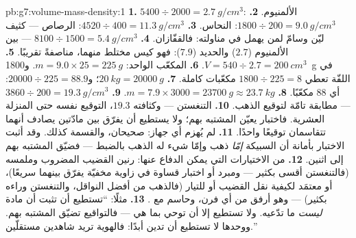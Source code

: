 \begin{solution}{pb:g7:volume-mass-density:1}
\textbf{1.} $5400 \div 2000 = \qty{2.7}{g/cm^3}$: الألمنيوم.
\textbf{2.} $1800 \div 200 = \qty{9.0}{g/cm^3}$: النحاس.
\textbf{3.} $4520 \div 400 = \qty{11.3}{g/cm^3}$: الرصاص ---
كثيف ليّن وسامّ لمن يهمل في مناولته: فالقفّازان.
\textbf{4.} $8100 \div 1500 = \qty{5.4}{g/cm^3}$ --- بين
الألمنيوم ($2.7$) والحديد ($7.9$): فهو كيس مختلط منهما،
مناصفةً  تقريبًا.
\textbf{5.} $V = 540 \div 2.7 = \qty{200}{cm^3}$.
\textbf{6.} المكعّب الواحد: $m = 9.0 \times 25 = \qty{225}{g}$.
و\qty{1800}{g} في اللفّة تعطي $1800 \div 225 = 8$ مكعّبات
كاملة.
\textbf{7.} $\qty{20}{kg} = \qty{20000}{g}$؛ و$20000 \div 225 =
88.9$: أي $88$ مكعّبًا.
\textbf{8.} $m = 7.9 \times 3000 = \qty{23700}{g} \approx
\qty{23.7}{kg}$.
\textbf{9.} $3860 \div 200 = \qty{19.3}{g/cm^3}$ --- مطابقة
تامّة لتوقيع الذهب.
\textbf{10.} التنغستن --- وكثافته $19.3$، التوقيع نفسه حتى
المنزلة العشرية. فاختبار  يعيّن المشتبه بهم؛ ولا يستطيع
أن يفرّق بين مادّتين يصادف أنهما تتقاسمان توقيعًا واحدًا.
\textbf{11.} لم يُهزم أي جهاز:   صحيحان، والقسمة
كذلك. وقد أثبت الاختبار بأمانة أن السبيكة \emph{إمّا} ذهب
وإمّا شيء له  الذهب بالضبط --- فضيّق المشتبه بهم إلى
اثنين.
\textbf{12.} من الاختيارات التي يمكن الدفاع عنها: رنين القضيب
المضروب وملمسه (فالتنغستن أقسى بكثير --- ومبرد أو اختبار قساوة
في زاوية مخفيّة يفرّق بينهما سريعًا)، أو  معتمَد لكيفية
نقل القضيب  أو للتيار (فالذهب من أفضل النواقل،
والتنغستن وراءه بكثير) --- وهو أرفق من أي فرن، وحاسم مع
.
\textbf{13.} مثلًا: ``تستطيع  أن تثبت أن مادة
\emph{ليست} ما تدّعيه. ولا تستطيع إلا أن توحي بما هي ---
فالتواقيع تضيّق المشتبه بهم. ووحدها لا تستطيع أن تدين أبدًا:
فالهوية تريد شاهدين مستقلّين.''
\end{solution}
